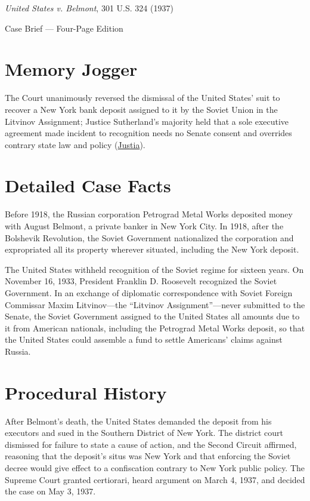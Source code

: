 \documentclass[12pt]{article}
\begin{document}
\begin{center}
{\LARGE \textit{United States v. Belmont}, 301 U.S. 324 (1937)\par}
\vspace{0.8em}
{\large Case Brief --- Four-Page Edition\par}
\end{center}
\vspace{1em}

\section{Memory Jogger}

The Court unanimously reversed the dismissal of the United States' suit to recover a New York bank deposit assigned to it by the Soviet Union in the Litvinov Assignment; Justice Sutherland's majority held that a sole executive agreement made incident to recognition needs no Senate consent and overrides contrary state law and policy (\href{https://supreme.justia.com/cases/federal/us/301/324/}{Justia}).

\section{Detailed Case Facts}

Before 1918, the Russian corporation Petrograd Metal Works deposited money with August Belmont, a private banker in New York City. In 1918, after the Bolshevik Revolution, the Soviet Government nationalized the corporation and expropriated all its property wherever situated, including the New York deposit.

The United States withheld recognition of the Soviet regime for sixteen years. On November 16, 1933, President Franklin D. Roosevelt recognized the Soviet Government. In an exchange of diplomatic correspondence with Soviet Foreign Commissar Maxim Litvinov---the ``Litvinov Assignment''---never submitted to the Senate, the Soviet Government assigned to the United States all amounts due to it from American nationals, including the Petrograd Metal Works deposit, so that the United States could assemble a fund to settle Americans' claims against Russia.

\section{Procedural History}

After Belmont's death, the United States demanded the deposit from his executors and sued in the Southern District of New York. The district court dismissed for failure to state a cause of action, and the Second Circuit affirmed, reasoning that the deposit's situs was New York and that enforcing the Soviet decree would give effect to a confiscation contrary to New York public policy. The Supreme Court granted certiorari, heard argument on March 4, 1937, and decided the case on May 3, 1937.
\end{document}
